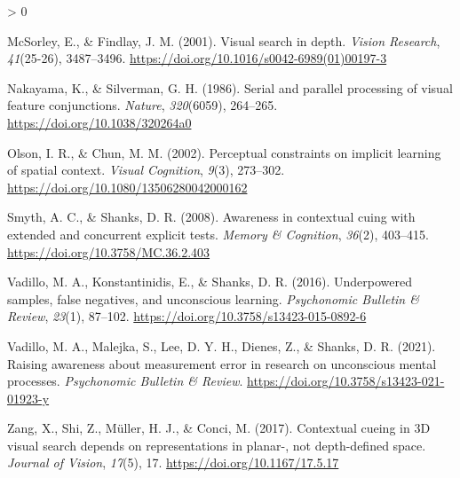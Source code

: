 \documentclass[
  english,
  man,floatsintext]{apa7}
\newlength{\cslhangindent}
\newenvironment{CSLReferences}[2] %
 {%
  \setlength{\parindent}{0pt}
  \ifodd #1 \everypar{\setlength{\hangindent}{\cslhangindent}}\ignorespaces\fi
  \ifnum #2 > 0
  \setlength{\parskip}{#2\baselineskip}
  \fi
 }%
 {}
\begin{document}
\begin{CSLReferences}{1}{0}
\leavevmode\hypertarget{ref-mcsorley2001}{}%
McSorley, E., \& Findlay, J. M. (2001). Visual search in depth. \emph{Vision Research}, \emph{41}(25-26), 3487--3496. \url{https://doi.org/10.1016/s0042-6989(01)00197-3}

\leavevmode\hypertarget{ref-nakayama1986}{}%
Nakayama, K., \& Silverman, G. H. (1986). Serial and parallel processing of visual feature conjunctions. \emph{Nature}, \emph{320}(6059), 264--265. \url{https://doi.org/10.1038/320264a0}

\leavevmode\hypertarget{ref-olson2002}{}%
Olson, I. R., \& Chun, M. M. (2002). Perceptual constraints on implicit learning of spatial context. \emph{Visual Cognition}, \emph{9}(3), 273--302. \url{https://doi.org/10.1080/13506280042000162}

\leavevmode\hypertarget{ref-smyth2008}{}%
Smyth, A. C., \& Shanks, D. R. (2008). Awareness in contextual cuing with extended and concurrent explicit tests. \emph{Memory \& Cognition}, \emph{36}(2), 403--415. \url{https://doi.org/10.3758/MC.36.2.403}

\leavevmode\hypertarget{ref-vadillo2016}{}%
Vadillo, M. A., Konstantinidis, E., \& Shanks, D. R. (2016). Underpowered samples, false negatives, and unconscious learning. \emph{Psychonomic Bulletin \& Review}, \emph{23}(1), 87--102. \url{https://doi.org/10.3758/s13423-015-0892-6}

\leavevmode\hypertarget{ref-vadillo2021}{}%
Vadillo, M. A., Malejka, S., Lee, D. Y. H., Dienes, Z., \& Shanks, D. R. (2021). Raising awareness about measurement error in research on unconscious mental processes. \emph{Psychonomic Bulletin \& Review}. \url{https://doi.org/10.3758/s13423-021-01923-y}

\leavevmode\hypertarget{ref-zang2017}{}%
Zang, X., Shi, Z., Müller, H. J., \& Conci, M. (2017). Contextual cueing in 3D visual search depends on representations in planar-, not depth-defined space. \emph{Journal of Vision}, \emph{17}(5), 17. \url{https://doi.org/10.1167/17.5.17}

\end{CSLReferences}
\end{document}
